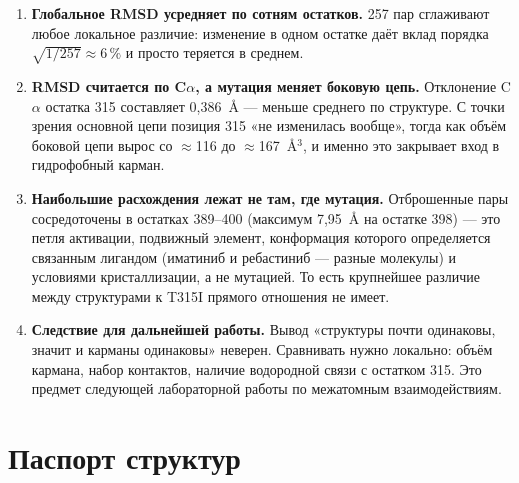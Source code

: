 \documentclass[12pt,a4paper]{article}
\begin{document}
\begin{enumerate}[leftmargin=*,topsep=2pt,itemsep=3pt]
\item \textbf{Глобальное RMSD усредняет по сотням остатков.} 257 пар сглаживают любое
локальное различие: изменение в одном остатке даёт вклад порядка
$\sqrt{1/257} \approx 6\,\%$ и просто теряется в среднем.
\item \textbf{RMSD считается по C$\alpha$, а мутация меняет боковую цепь.} Отклонение
C$\alpha$ остатка 315 составляет 0{,}386~\AA{} --- меньше среднего по структуре. С точки
зрения основной цепи позиция 315 «не изменилась вообще», тогда как объём боковой цепи
вырос со $\approx$116 до $\approx$167~\AA$^3$, и именно это закрывает вход в
гидрофобный карман.
\item \textbf{Наибольшие расхождения лежат не там, где мутация.} Отброшенные пары
сосредоточены в остатках 389--400 (максимум 7{,}95~\AA{} на остатке 398) --- это петля
активации, подвижный элемент, конформация которого определяется связанным лигандом
(иматиниб и ребастиниб --- разные молекулы) и условиями кристаллизации, а не мутацией.
То есть крупнейшее различие между структурами к T315I прямого отношения не имеет.
\item \textbf{Следствие для дальнейшей работы.} Вывод «структуры почти одинаковы,
значит и карманы одинаковы» неверен. Сравнивать нужно локально: объём кармана, набор
контактов, наличие водородной связи с остатком 315. Это предмет следующей лабораторной
работы по межатомным взаимодействиям.
\end{enumerate}

\section{Паспорт структур}
\end{document}
